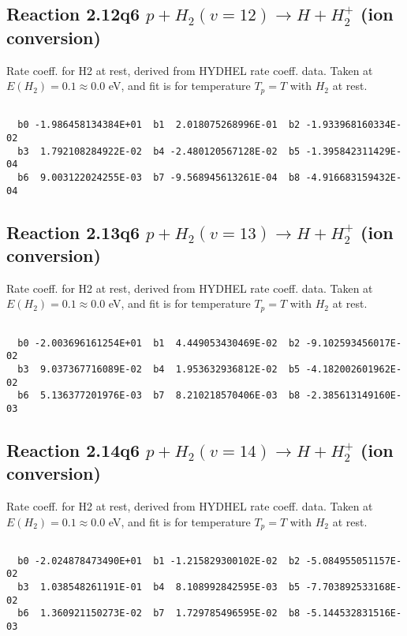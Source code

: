 \newpage
\subsection{
Reaction 2.12q6
$ p + H_2(v=12) \rightarrow H + H_2^+$ (ion conversion)
}
Rate coeff. for H2 at rest, derived from HYDHEL rate coeff. data.
Taken at $E(H_2) = 0.1 \approx 0.0$ eV,  and fit is for temperature $T_p=T$ with $H_2$ at rest.

\begin{small}\begin{verbatim}

  b0 -1.986458134384E+01  b1  2.018075268996E-01  b2 -1.933968160334E-02
  b3  1.792108284922E-02  b4 -2.480120567128E-02  b5 -1.395842311429E-04
  b6  9.003122024255E-03  b7 -9.568945613261E-04  b8 -4.916683159432E-04

\end{verbatim}\end{small}

\newpage
\subsection{
Reaction 2.13q6
$ p + H_2(v=13) \rightarrow H + H_2^+$ (ion conversion)
}
Rate coeff. for H2 at rest, derived from HYDHEL rate coeff. data.
Taken at $E(H_2) = 0.1 \approx 0.0$ eV,  and fit is for temperature $T_p=T$ with $H_2$ at rest.

\begin{small}\begin{verbatim}

  b0 -2.003696161254E+01  b1  4.449053430469E-02  b2 -9.102593456017E-02
  b3  9.037367716089E-02  b4  1.953632936812E-02  b5 -4.182002601962E-02
  b6  5.136377201976E-03  b7  8.210218570406E-03  b8 -2.385613149160E-03

\end{verbatim}\end{small}

\newpage
\subsection{
Reaction 2.14q6
$ p + H_2(v=14) \rightarrow H + H_2^+$ (ion conversion)
}
Rate coeff. for H2 at rest, derived from HYDHEL rate coeff. data.
Taken at $E(H_2) = 0.1 \approx 0.0$ eV,  and fit is for temperature $T_p=T$ with $H_2$ at rest.

\begin{small}\begin{verbatim}

  b0 -2.024878473490E+01  b1 -1.215829300102E-02  b2 -5.084955051157E-02
  b3  1.038548261191E-01  b4  8.108992842595E-03  b5 -7.703892533168E-02
  b6  1.360921150273E-02  b7  1.729785496595E-02  b8 -5.144532831516E-03

\end{verbatim}\end{small}

\newpage
